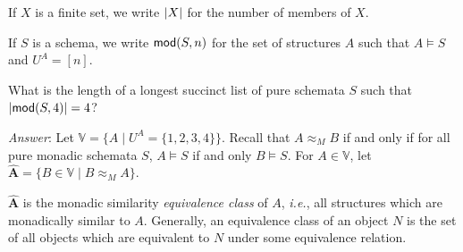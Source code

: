 \begin{definition}
If $X$ is a finite set, we write $\mbox{$|X|$}$ for the number of members of $X$.

If $S$ is a schema, we write $\mbox{$\mathsf {mod}(S,n)$}$ for the set of structures $A$ such that $A\models S$ and $U^A=[n]$.
\end{definition}
\begin{question}\label{mspec-q}
What is the length of a longest succinct list of pure schemata $S$ such that $\mbox{$|\mbox{$\mathsf {mod}(S,4)$}|$}=4$?
\end{question}

\emph{Answer}:
Let $\mathbb{V} = \{A\mid U^A=\{1,2,3,4\}\}$. Recall that $A\approx_M B$ if and only if for all pure monadic schemata $S$, $A\models S$ if and only $B\models S$. For $A\in \mathbb{V}$, let $\bm\hat{A}=\{B\in \mathbb{V}\mid B\approx_M A\}$.

\begin{aside}
    $\bm\hat{A}$ is the monadic similarity \emph{equivalence class} of $A$, \textit{i.e.}, all structures which are monadically similar to $A$. Generally, an equivalence class of an object $N$ is the set of all objects which are equivalent to $N$ under some equivalence relation. 
\end{aside}

